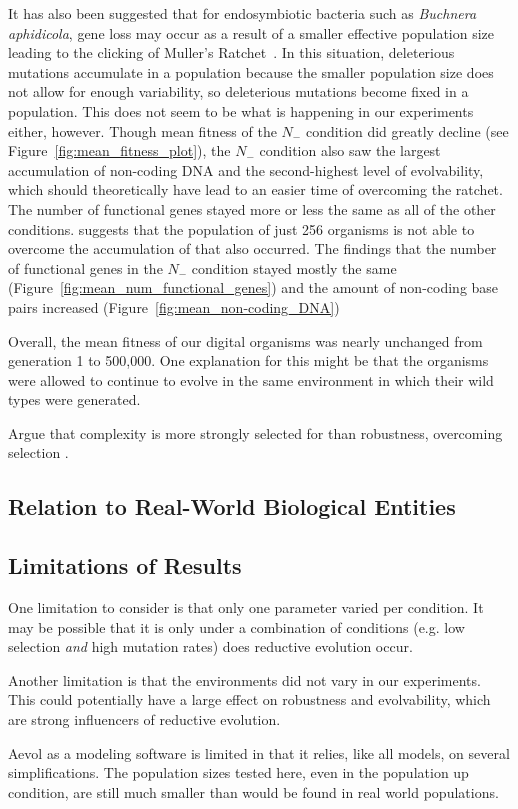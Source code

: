 It has also been suggested that for endosymbiotic bacteria such as \textit{Buchnera aphidicola}, gene loss may occur as a result of a smaller effective population size leading to the clicking of Muller's Ratchet~\cite{Batut.2014}. In this situation, deleterious mutations accumulate in a population because the smaller population size does not allow for enough variability, so deleterious mutations become fixed in a population. This does not seem to be what is happening in our experiments either, however. Though mean fitness of the $N_-$ condition did greatly decline (see Figure~\ref{fig:mean_fitness_plot}), the $N_-$ condition also saw the largest accumulation of non-coding DNA and the second-highest level of evolvability, which should theoretically have lead to an easier time of overcoming the ratchet. The number of functional genes stayed more or less the same as all of the other conditions.   suggests that the population of just 256 organisms is not able to overcome the accumulation of that also occurred. The findings that the number of functional genes in the $N_-$ condition stayed mostly the same (Figure~\ref{fig:mean_num_functional_genes}) and the amount of non-coding base pairs increased (Figure~\ref{fig:mean_non-coding_DNA}) 

Overall, the mean fitness of our digital organisms was nearly unchanged from generation 1 to 500,000. One explanation for this might be that the organisms were allowed to continue to evolve in the same environment in which their wild types were generated. 

Argue that complexity is more strongly selected for than robustness, overcoming selection \cite{Liard.2018}.

\subsection{Relation to Real-World Biological Entities}
\subsection{Limitations of Results}\label{limitations}
One limitation to consider is that only one parameter varied per condition. It may be possible that it is only under a combination of conditions (e.g. low selection \textit{and} high mutation rates) does reductive evolution occur. 

Another limitation is that the environments did not vary in our experiments. This could potentially have a large effect on robustness and evolvability, which are strong influencers of reductive evolution. 

Aevol as a modeling software is limited in that it relies, like all models, on several simplifications. The population sizes tested here, even in the population up condition, are still much smaller than would be found in real world populations. 